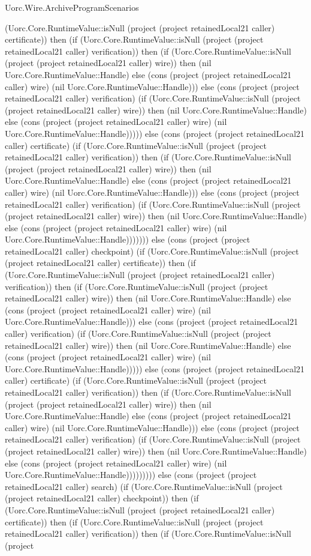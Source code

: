 \begin{lexlean}{Uorc.Wire.ArchiveProgramScenarios}
\begin{semanticmodule}
{(Uorc.Core.RuntimeValue::isNull (project (project retainedLocal21 caller) certificate)) then (if (Uorc.Core.RuntimeValue::isNull (project (project retainedLocal21 caller) verification)) then (if (Uorc.Core.RuntimeValue::isNull (project (project retainedLocal21 caller) wire)) then (nil Uorc.Core.RuntimeValue::Handle) else (cons (project (project retainedLocal21 caller) wire) (nil Uorc.Core.RuntimeValue::Handle))) else (cons (project (project retainedLocal21 caller) verification) (if (Uorc.Core.RuntimeValue::isNull (project (project retainedLocal21 caller) wire)) then (nil Uorc.Core.RuntimeValue::Handle) else (cons (project (project retainedLocal21 caller) wire) (nil Uorc.Core.RuntimeValue::Handle))))) else (cons (project (project retainedLocal21 caller) certificate) (if (Uorc.Core.RuntimeValue::isNull (project (project retainedLocal21 caller) verification)) then (if (Uorc.Core.RuntimeValue::isNull (project (project retainedLocal21 caller) wire)) then (nil Uorc.Core.RuntimeValue::Handle) else (cons (project (project retainedLocal21 caller) wire) (nil Uorc.Core.RuntimeValue::Handle))) else (cons (project (project retainedLocal21 caller) verification) (if (Uorc.Core.RuntimeValue::isNull (project (project retainedLocal21 caller) wire)) then (nil Uorc.Core.RuntimeValue::Handle) else (cons (project (project retainedLocal21 caller) wire) (nil Uorc.Core.RuntimeValue::Handle))))))) else (cons (project (project retainedLocal21 caller) checkpoint) (if (Uorc.Core.RuntimeValue::isNull (project (project retainedLocal21 caller) certificate)) then (if (Uorc.Core.RuntimeValue::isNull (project (project retainedLocal21 caller) verification)) then (if (Uorc.Core.RuntimeValue::isNull (project (project retainedLocal21 caller) wire)) then (nil Uorc.Core.RuntimeValue::Handle) else (cons (project (project retainedLocal21 caller) wire) (nil Uorc.Core.RuntimeValue::Handle))) else (cons (project (project retainedLocal21 caller) verification) (if (Uorc.Core.RuntimeValue::isNull (project (project retainedLocal21 caller) wire)) then (nil Uorc.Core.RuntimeValue::Handle) else (cons (project (project retainedLocal21 caller) wire) (nil Uorc.Core.RuntimeValue::Handle))))) else (cons (project (project retainedLocal21 caller) certificate) (if (Uorc.Core.RuntimeValue::isNull (project (project retainedLocal21 caller) verification)) then (if (Uorc.Core.RuntimeValue::isNull (project (project retainedLocal21 caller) wire)) then (nil Uorc.Core.RuntimeValue::Handle) else (cons (project (project retainedLocal21 caller) wire) (nil Uorc.Core.RuntimeValue::Handle))) else (cons (project (project retainedLocal21 caller) verification) (if (Uorc.Core.RuntimeValue::isNull (project (project retainedLocal21 caller) wire)) then (nil Uorc.Core.RuntimeValue::Handle) else (cons (project (project retainedLocal21 caller) wire) (nil Uorc.Core.RuntimeValue::Handle))))))))) else (cons (project (project retainedLocal21 caller) search) (if (Uorc.Core.RuntimeValue::isNull (project (project retainedLocal21 caller) checkpoint)) then (if (Uorc.Core.RuntimeValue::isNull (project (project retainedLocal21 caller) certificate)) then (if (Uorc.Core.RuntimeValue::isNull (project (project retainedLocal21 caller) verification)) then (if (Uorc.Core.RuntimeValue::isNull (project }
\end{semanticmodule}
\end{lexlean}
